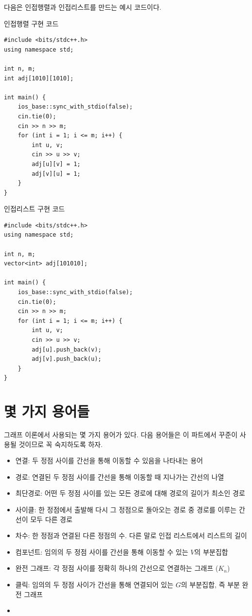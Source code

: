 다음은 인접행렬과 인접리스트를 만드는 예시 코드이다.
\begin{code} \label{code: adj-matrix}
인접행렬 구현 코드
\begin{lstlisting}
#include <bits/stdc++.h>
using namespace std;

int n, m;
int adj[1010][1010];

int main() {
    ios_base::sync_with_stdio(false);
    cin.tie(0);
    cin >> n >> m;
    for (int i = 1; i <= m; i++) {
        int u, v;
        cin >> u >> v;
        adj[u][v] = 1;
        adj[v][u] = 1;
    }
}
\end{lstlisting}
\end{code}

\begin{code} \label{code: adj-list}
인접리스트 구현 코드
\begin{lstlisting}
#include <bits/stdc++.h>
using namespace std;

int n, m;
vector<int> adj[101010];

int main() {
    ios_base::sync_with_stdio(false);
    cin.tie(0);
    cin >> n >> m;
    for (int i = 1; i <= m; i++) {
        int u, v;
        cin >> u >> v;
        adj[u].push_back(v);
        adj[v].push_back(u);
    }
}
\end{lstlisting}
\end{code}

\section{몇 가지 용어들}
그래프 이론에서 사용되는 몇 가지 용어가 있다. 다음 용어들은 이 파트에서 꾸준이 사용될 것이므로 꼭 숙지하도록 하자.

\begin{itemize}
    \item 연결: 두 정점 사이를 간선을 통해 이동할 수 있음을 나타내는 용어
    \item 경로: 연결된 두 정점 사이를 간선을 통해 이동할 때 지나가는 간선의 나열
    \item 최단경로: 어떤 두 정점 사이를 있는 모든 경로에 대해 경로의 길이가 최소인 경로
    \item 사이클: 한 정점에서 출발해 다시 그 정점으로 돌아오는 경로 중 경로를 이루는 간선이 모두 다른 경로
    \item 차수: 한 정점과 연결된 다른 정점의 수. 다른 말로 인접 리스트에서 리스트의 길이
    \item 컴포넌트: 임의의 두 정점 사이를 간선을 통해 이동할 수 있는 $V$의 부분집합
    \item 완전 그래프: 각 정점 사이를 정확히 하나의 간선으로 연결하는 그래프 ($K_n$)
    \item 클릭: 임의의 두 정점 사이가 간선을 통해 연결되어 있는 $G$의 부분집합, 즉 부분 완전 그래프
    \item 
\end{itemize}

